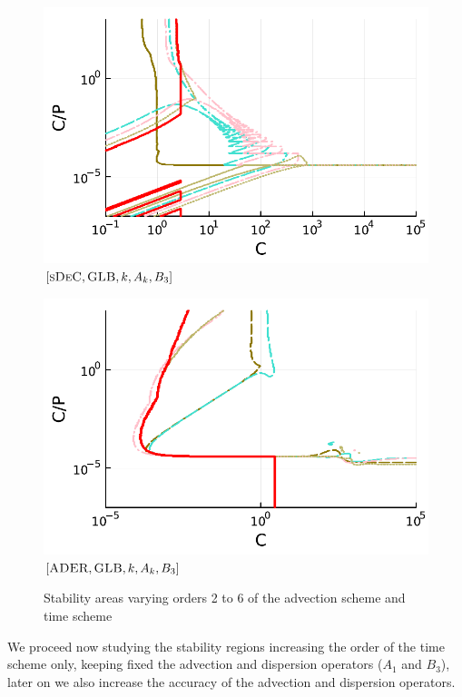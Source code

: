 \begin{figure}
\begin{minipage}[t]{0.325\textwidth}
		\includegraphics[width=\textwidth]{pdf/pdepics/disp/IMEXDeC_subtimesteps_gaussLobatto_disp_advTMM_2-6_newE.pdf}
		\small$[\textsc{sDeC}, \textsc{GLB},k,A_k,B_3]$\par
	\end{minipage}
	\begin{minipage}[t]{0.325\textwidth}
		\centering
		\includegraphics[width=\textwidth]{pdf/pdepics/disp/IMEXADER_gaussLobatto_disp_advTMM_2-6_newE.pdf}
		\small$[\textsc{ADER}, \textsc{GLB},k,A_k,B_3]$\par
	\end{minipage}
	\caption{Stability areas varying orders 2 to 6 of the advection scheme and time scheme}
	\label{fig: disp_alladv_GLB}
\end{figure}
We proceed now studying the stability regions increasing the order of the time scheme only, keeping fixed the advection and dispersion operators ($A_1$ and $B_3$), later on we also increase the accuracy of the advection and dispersion operators.
